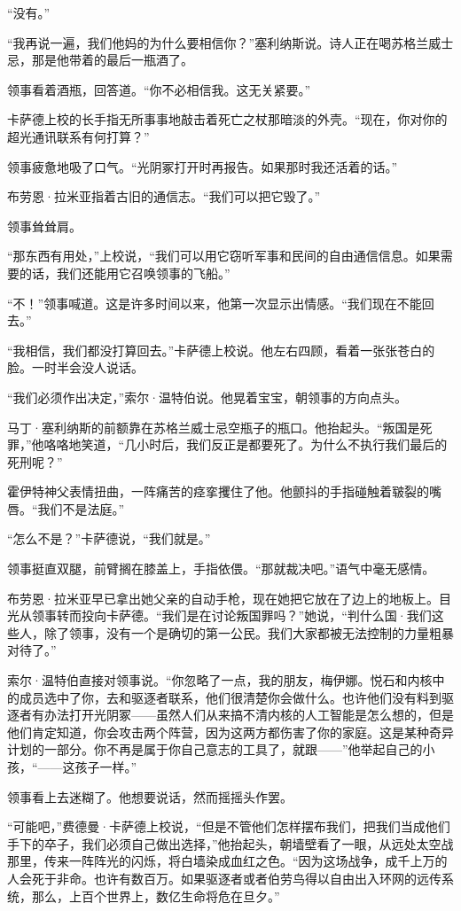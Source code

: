 \documentclass[AutoFakeBold=true]{book}
\begin{document}
``没有。''

``我再说一遍，我们他妈的为什么要相信你？''塞利纳斯说。诗人正在喝苏格兰威士忌，那是他带着的最后一瓶酒了。

领事看着酒瓶，回答道。``你不必相信我。这无关紧要。''

卡萨德上校的长手指无所事事地敲击着死亡之杖那暗淡的外壳。``现在，你对你的超光通讯联系有何打算？''

领事疲惫地吸了口气。``光阴冢打开时再报告。如果那时我还活着的话。''

布劳恩·拉米亚指着古旧的通信志。``我们可以把它毁了。''

领事耸耸肩。

``那东西有用处，''上校说，``我们可以用它窃听军事和民间的自由通信信息。如果需要的话，我们还能用它召唤领事的飞船。''

``不！''领事喊道。这是许多时间以来，他第一次显示出情感。``我们现在不能回去。''

``我相信，我们都没打算回去。''卡萨德上校说。他左右四顾，看着一张张苍白的脸。一时半会没人说话。

``我们必须作出决定，''索尔·温特伯说。他晃着宝宝，朝领事的方向点头。

马丁·塞利纳斯的前额靠在苏格兰威士忌空瓶子的瓶口。他抬起头。``叛国是死罪，''他咯咯地笑道，``几小时后，我们反正是都要死了。为什么不执行我们最后的死刑呢？''

霍伊特神父表情扭曲，一阵痛苦的痉挛攫住了他。他颤抖的手指碰触着皲裂的嘴唇。``我们不是法庭。''

``怎么不是？''卡萨德说，``我们就是。''

领事挺直双腿，前臂搁在膝盖上，手指依偎。``那就裁决吧。''语气中毫无感情。

布劳恩·拉米亚早已拿出她父亲的自动手枪，现在她把它放在了边上的地板上。目光从领事转而投向卡萨德。``我们是在讨论叛国罪吗？''她说，``判什么国·我们这些人，除了领事，没有一个是确切的第一公民。我们大家都被无法控制的力量粗暴对待了。''

索尔·温特伯直接对领事说。``你忽略了一点，我的朋友，梅伊娜。悦石和内核中的成员选中了你，去和驱逐者联系，他们很清楚你会做什么。也许他们没有料到驱逐者有办法打开光阴冢——虽然人们从来搞不清内核的人工智能是怎么想的，但是他们肯定知道，你会攻击两个阵营，因为这两方都伤害了你的家庭。这是某种奇异计划的一部分。你不再是属于你自己意志的工具了，就跟——''他举起自己的小孩，``——这孩子一样。''

领事看上去迷糊了。他想要说话，然而摇摇头作罢。

``可能吧，''费德曼·卡萨德上校说，``但是不管他们怎样摆布我们，把我们当成他们手下的卒子，我们必须自己做出选择，''他抬起头，朝墙壁看了一眼，从远处太空战那里，传来一阵阵光的闪烁，将白墙染成血红之色。``因为这场战争，成千上万的人会死于非命。也许有数百万。如果驱逐者或者伯劳鸟得以自由出入环网的远传系统，那么，上百个世界上，数亿生命将危在旦夕。''
\end{document}
